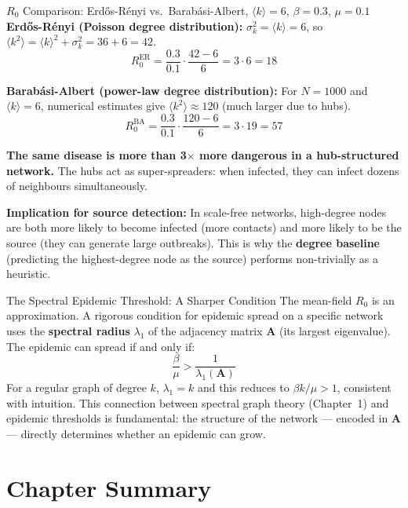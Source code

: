 \begin{examplebox}{$R_0$ Comparison: Erd\H{o}s-R\'enyi vs.\ Barab\'asi-Albert, $\langle k \rangle = 6$, $\beta = 0.3$, $\mu = 0.1$}
\textbf{Erd\H{o}s-R\'enyi (Poisson degree distribution):} $\sigma_k^2 = \langle k \rangle = 6$, so $\langle k^2 \rangle = \langle k \rangle^2 + \sigma_k^2 = 36 + 6 = 42$.
\[
R_0^{\mathrm{ER}} = \frac{0.3}{0.1} \cdot \frac{42 - 6}{6} = 3 \cdot 6 = 18
\]

\textbf{Barab\'asi-Albert (power-law degree distribution):} For $N = 1000$ and $\langle k \rangle = 6$, numerical estimates give $\langle k^2 \rangle \approx 120$ (much larger due to hubs).
\[
R_0^{\mathrm{BA}} = \frac{0.3}{0.1} \cdot \frac{120 - 6}{6} = 3 \cdot 19 = 57
\]

\textbf{The same disease is more than 3$\times$ more dangerous in a hub-structured network.} The hubs act as super-spreaders: when infected, they can infect dozens of neighbours simultaneously.

\textbf{Implication for source detection:} In scale-free networks, high-degree nodes are both more likely to become infected (more contacts) and more likely to be the source (they can generate large outbreaks). This is why the \textbf{degree baseline} (predicting the highest-degree node as the source) performs non-trivially as a heuristic.
\end{examplebox}

\begin{keyinsight}{The Spectral Epidemic Threshold: A Sharper Condition}
The mean-field $R_0$ is an approximation. A rigorous condition for epidemic spread on a specific network uses the \textbf{spectral radius} $\lambda_1$ of the adjacency matrix $\mathbf{A}$ (its largest eigenvalue). The epidemic can spread if and only if:
\begin{equation}
    \frac{\beta}{\mu} > \frac{1}{\lambda_1(\mathbf{A})}
    \label{eq:spectral_threshold}
\end{equation}
For a regular graph of degree $k$, $\lambda_1 = k$ and this reduces to $\beta k / \mu > 1$, consistent with intuition. This connection between spectral graph theory (Chapter~1) and epidemic thresholds is fundamental: the structure of the network --- encoded in $\mathbf{A}$ --- directly determines whether an epidemic can grow.
\end{keyinsight}

\section{Chapter Summary}
\label{sec:epi_summary}

